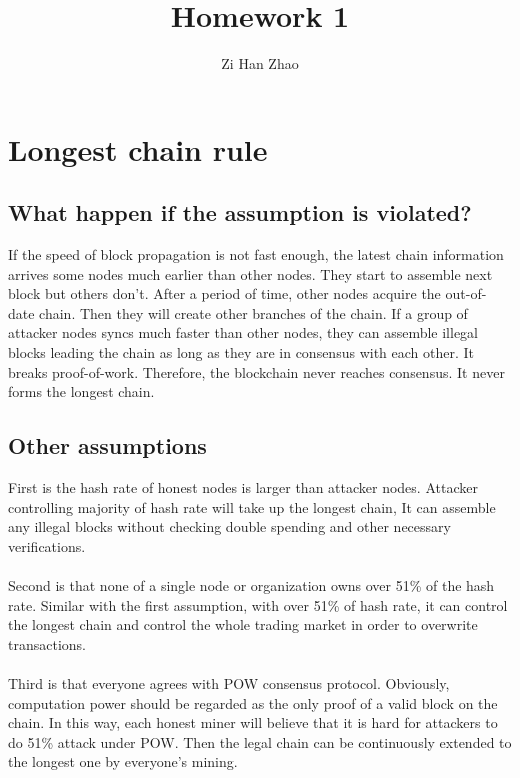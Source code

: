 \documentclass{article}
\author{Zi Han Zhao}
\affil{1001103708}
\title{Homework 1}
\date{}
\begin{document}
\maketitle
\section{Longest chain rule}
\renewcommand{\thesubsection}{(\alph{subsection})}
\subsection{What happen if the assumption is violated?}
If the speed of block propagation is not fast enough, the latest chain information arrives some nodes much earlier than other nodes. They start to assemble next block but others don't. After a period of time, other nodes acquire the out-of-date chain. Then they will create other branches of the chain. If a group of attacker nodes syncs much faster than other nodes, they can assemble illegal blocks leading the chain as long as they are in consensus with each other. It breaks proof-of-work. Therefore, the blockchain never reaches consensus. It never forms the longest chain.
\subsection{Other assumptions}
First is the hash rate of honest nodes is larger than attacker nodes. Attacker controlling majority of hash rate will take up the longest chain, It can assemble any illegal blocks without checking double spending and other necessary verifications.\\\\
Second is that none of a single node or organization owns over 51\% of the hash rate. Similar with the first assumption, with over 51\% of hash rate, it can control the longest chain and control the whole trading market in order to overwrite transactions.\\\\
Third is that everyone agrees with POW consensus protocol. Obviously, computation power should be regarded as the only proof of a valid block on the chain. In this way, each honest miner will believe that it is hard for attackers to do 51\% attack under POW. Then the legal chain can be continuously extended to the longest one by everyone's mining.
\end{document}
